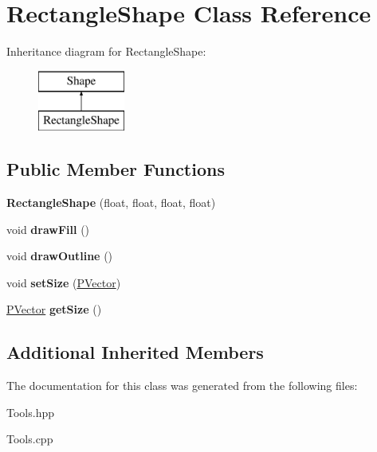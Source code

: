 \hypertarget{class_rectangle_shape}{}\section{Rectangle\+Shape Class Reference}
\label{class_rectangle_shape}
Inheritance diagram for Rectangle\+Shape\+:\begin{figure}[H]
\begin{center}
\leavevmode
\includegraphics[height=2.000000cm]{class_rectangle_shape}
\end{center}
\end{figure}
\subsection*{Public Member Functions}
\begin{DoxyCompactItemize}
\item 
\hypertarget{class_rectangle_shape_aaca6ad79b0f0f6a2cdd3b07cb7d132ed}{}\label{class_rectangle_shape_aaca6ad79b0f0f6a2cdd3b07cb7d132ed} 
{\bfseries Rectangle\+Shape} (float, float, float, float)
\item 
\hypertarget{class_rectangle_shape_a5981b643c3f26733159e92910eaa25ee}{}\label{class_rectangle_shape_a5981b643c3f26733159e92910eaa25ee} 
void {\bfseries draw\+Fill} ()
\item 
\hypertarget{class_rectangle_shape_af4c688f1ad48c2ba76970d93d19f5b4b}{}\label{class_rectangle_shape_af4c688f1ad48c2ba76970d93d19f5b4b} 
void {\bfseries draw\+Outline} ()
\item 
\hypertarget{class_rectangle_shape_a8736f7ba16291db873ad9d31570bba06}{}\label{class_rectangle_shape_a8736f7ba16291db873ad9d31570bba06} 
void {\bfseries set\+Size} (\hyperlink{struct_p_vector}{P\+Vector})
\item 
\hypertarget{class_rectangle_shape_a4788f9784e80e4bfbfa913207d98c558}{}\label{class_rectangle_shape_a4788f9784e80e4bfbfa913207d98c558} 
\hyperlink{struct_p_vector}{P\+Vector} {\bfseries get\+Size} ()
\end{DoxyCompactItemize}
\subsection*{Additional Inherited Members}


The documentation for this class was generated from the following files\+:\begin{DoxyCompactItemize}
\item 
Tools.\+hpp\item 
Tools.\+cpp\end{DoxyCompactItemize}
